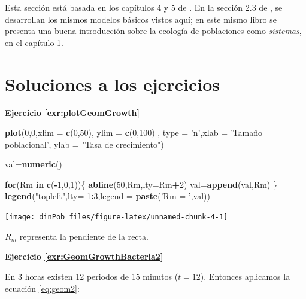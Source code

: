 \documentclass[12pt,letterpaper,]{book}
\newenvironment{Shaded}{\begin{snugshade}}{\end{snugshade}}
\newcommand{\KeywordTok}[1]{\textcolor[rgb]{0.13,0.29,0.53}{\textbf{#1}}}
\newcommand{\DataTypeTok}[1]{\textcolor[rgb]{0.13,0.29,0.53}{#1}}
\newcommand{\DecValTok}[1]{\textcolor[rgb]{0.00,0.00,0.81}{#1}}
\newcommand{\StringTok}[1]{\textcolor[rgb]{0.31,0.60,0.02}{#1}}
\newcommand{\ControlFlowTok}[1]{\textcolor[rgb]{0.13,0.29,0.53}{\textbf{#1}}}
\newcommand{\OperatorTok}[1]{\textcolor[rgb]{0.81,0.36,0.00}{\textbf{#1}}}
\newcommand{\NormalTok}[1]{#1}
\begin{document}
Esta sección está basada en los capítulos 4 y 5 de \citet{NealPopBio}.
En la sección 2.3 de \citet{PopSystem}, se desarrollan los mismos
modelos básicos vistos aquí; en este mismo libro se presenta una buena
introducción sobre la ecología de poblaciones como \emph{sistemas}, en
el capítulo 1.

\chapter{Soluciones a los ejercicios}\label{soluciones-a-los-ejercicios}

\textbf{Ejercicio \ref{exr:plotGeomGrowth}}

\begin{Shaded}
\begin{Highlighting}[]
\KeywordTok{plot}\NormalTok{(}\DecValTok{0}\NormalTok{,}\DecValTok{0}\NormalTok{,}\DataTypeTok{xlim =} \KeywordTok{c}\NormalTok{(}\DecValTok{0}\NormalTok{,}\DecValTok{50}\NormalTok{),}
     \DataTypeTok{ylim =} \KeywordTok{c}\NormalTok{(}\DecValTok{0}\NormalTok{,}\DecValTok{100}\NormalTok{) ,}
     \DataTypeTok{type =} \StringTok{'n'}\NormalTok{,}\DataTypeTok{xlab =} \StringTok{'Tamaño poblacional'}\NormalTok{,}
     \DataTypeTok{ylab =} \StringTok{"Tasa de crecimiento"}\NormalTok{)}

\NormalTok{val=}\KeywordTok{numeric}\NormalTok{()}

\ControlFlowTok{for}\NormalTok{(Rm }\ControlFlowTok{in} \KeywordTok{c}\NormalTok{(}\OperatorTok{-}\DecValTok{1}\NormalTok{,}\DecValTok{0}\NormalTok{,}\DecValTok{1}\NormalTok{))\{}
  \KeywordTok{abline}\NormalTok{(}\DecValTok{50}\NormalTok{,Rm,}\DataTypeTok{lty=}\NormalTok{Rm}\OperatorTok{+}\DecValTok{2}\NormalTok{)}
\NormalTok{  val=}\KeywordTok{append}\NormalTok{(val,Rm)}
\NormalTok{\}}
\KeywordTok{legend}\NormalTok{(}\StringTok{"topleft"}\NormalTok{,}\DataTypeTok{lty=} \DecValTok{1}\OperatorTok{:}\DecValTok{3}\NormalTok{,}\DataTypeTok{legend =} \KeywordTok{paste}\NormalTok{(}\StringTok{'Rm = '}\NormalTok{,val))}
\end{Highlighting}
\end{Shaded}

\begin{center}\texttt{[image: dinPob\_files/figure-latex/unnamed-chunk-4-1]} \end{center}

\(R_m\) representa la pendiente de la recta.

\textbf{Ejercicio \ref{exr:GeomGrowthBacteria2}}

En 3 horas existen 12 periodos de 15 minutos (\(t=12\)). Entonces
aplicamos la ecuación \eqref{eq:geom2}:
\end{document}
